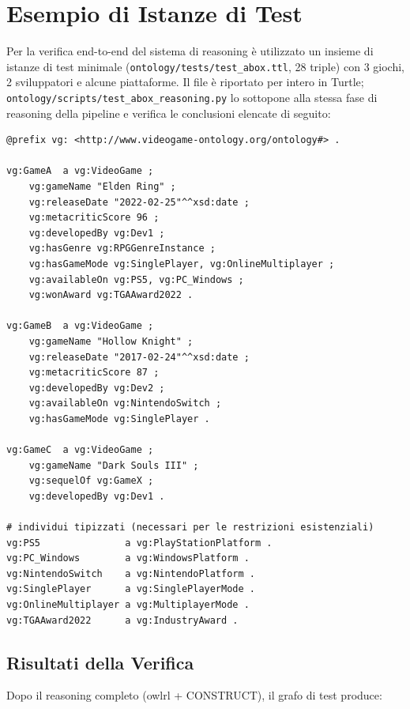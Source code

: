 \section{Esempio di Istanze di Test}
\label{sec:app_abox}

Per la verifica end-to-end del sistema di reasoning \`e utilizzato un insieme di istanze di test minimale
(\texttt{ontology/tests/test\_abox.ttl}, 28 triple) con 3 giochi, 2 sviluppatori e alcune piattaforme. Il file
\`e riportato per intero in Turtle; \texttt{ontology/scripts/test\_abox\_reasoning.py} lo sottopone alla stessa fase
di reasoning della pipeline e verifica le conclusioni elencate di seguito:

\begin{lstlisting}[style=turtle, caption={Istanze di test (Turtle)}, label={lst:testabox}]
@prefix vg: <http://www.videogame-ontology.org/ontology#> .

vg:GameA  a vg:VideoGame ;
    vg:gameName "Elden Ring" ;
    vg:releaseDate "2022-02-25"^^xsd:date ;
    vg:metacriticScore 96 ;
    vg:developedBy vg:Dev1 ;
    vg:hasGenre vg:RPGGenreInstance ;
    vg:hasGameMode vg:SinglePlayer, vg:OnlineMultiplayer ;
    vg:availableOn vg:PS5, vg:PC_Windows ;
    vg:wonAward vg:TGAAward2022 .

vg:GameB  a vg:VideoGame ;
    vg:gameName "Hollow Knight" ;
    vg:releaseDate "2017-02-24"^^xsd:date ;
    vg:metacriticScore 87 ;
    vg:developedBy vg:Dev2 ;
    vg:availableOn vg:NintendoSwitch ;
    vg:hasGameMode vg:SinglePlayer .

vg:GameC  a vg:VideoGame ;
    vg:gameName "Dark Souls III" ;
    vg:sequelOf vg:GameX ;
    vg:developedBy vg:Dev1 .

# individui tipizzati (necessari per le restrizioni esistenziali)
vg:PS5               a vg:PlayStationPlatform .
vg:PC_Windows        a vg:WindowsPlatform .
vg:NintendoSwitch    a vg:NintendoPlatform .
vg:SinglePlayer      a vg:SinglePlayerMode .
vg:OnlineMultiplayer a vg:MultiplayerMode .
vg:TGAAward2022      a vg:IndustryAward .
\end{lstlisting}

\subsection{Risultati della Verifica}

Dopo il reasoning completo (owlrl + CONSTRUCT), il grafo di test produce:

